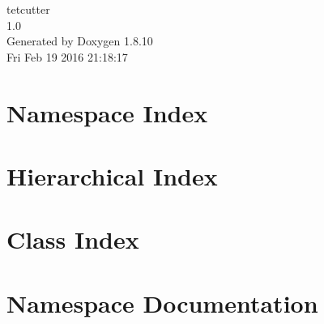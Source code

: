 \documentclass[twoside]{book}
\newcommand{\+}{\discretionary{\mbox{\scriptsize$\hookleftarrow$}}{}{}}
\newcommand{\clearemptydoublepage}{%
  \newpage{\pagestyle{empty}\cleardoublepage}%
}
\begin{document}
\hypersetup{pageanchor=false,
             bookmarks=true,
             bookmarksnumbered=true,
             pdfencoding=unicode
            }
\begin{titlepage}
\vspace*{7cm}
\begin{center}%
{\Large tetcutter \\[1ex]\large 1.\+0 }\\
\vspace*{1cm}
{\large Generated by Doxygen 1.8.10}\\
\vspace*{0.5cm}
{\small Fri Feb 19 2016 21:18:17}\\
\end{center}
\end{titlepage}
\clearemptydoublepage
\tableofcontents
\clearemptydoublepage
{}
\hypersetup{pageanchor=true}

\chapter{Namespace Index}

\chapter{Hierarchical Index}

\chapter{Class Index}

\chapter{Namespace Documentation}

\end{document}

